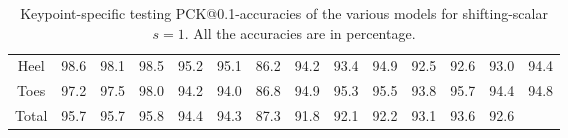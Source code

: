 \documentclass[./main.tex]{subfiles}
\begin{document}
\begin{table}[htbp]
\begin{adjustbox}{center}
\begin{tabular}{c||ccc|ccc|ccc|ccc|c}
            Heel & 98.6 & 98.1 & 98.5 & 95.2 & 95.1 & 86.2 & 94.2 & 93.4 & 94.9 & 92.5 & 92.6 & 93.0 & 94.4 \\
            Toes & 97.2 & 97.5 & 98.0 & 94.2 & 94.0 & 86.8 & 94.9 & 95.3 & 95.5 & 93.8 & 95.7 & 94.4 & 94.8 \\
            \hline
            Total & 95.7 & 95.7 & 95.8 & 94.4 & 94.3 & 87.3 & 91.8 & 92.1 & 92.2 & 93.1 & 93.6 & 92.6 & \\
            \hline
        \end{tabular}
    \end{adjustbox}
    \caption{Keypoint-specific testing PCK@0.1-accuracies of the various models for shifting-scalar $s = 1$. All the accuracies are in percentage.}
    \label{tab:finetune_kpts_test_accs_1_1}
\end{table}
\end{document}
